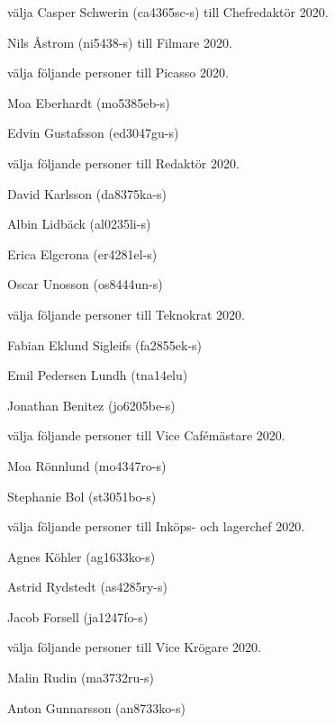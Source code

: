 \documentclass[10pt]{article}
\begin{document}
\begin{paragrafer}
\begin{paralist}
    \Mba välja Casper Schwerin (ca4365sc-s) till Chefredaktör 2020.

    \Mba Nils Åstrom (ni5438-s) till Filmare 2020.

    \Mba välja följande personer till Picasso 2020.
    \begin{tightdashlist}
        \item Moa Eberhardt (mo5385eb-s)
        \item Edvin Gustafsson (ed3047gu-s)
    \end{tightdashlist}

    \Mba välja följande personer till Redaktör 2020.
    \begin{tightdashlist}
        \item David Karlsson (da8375ka-s)
        \item Albin Lidbäck (al0235li-s)
        \item Erica Elgcrona (er4281el-s)
        \item Oscar Unosson (os8444un-s)
    \end{tightdashlist}

    \Mba välja följande personer till Teknokrat 2020.
    \begin{tightdashlist}
        \item Fabian Eklund Sigleifs (fa2855ek-s)
        \item Emil Pedersen Lundh (tna14elu)
        \item Jonathan Benitez (jo6205be-s)
    \end{tightdashlist}

    \Mba välja följande personer till Vice Cafémästare 2020.
    \begin{tightdashlist}
        \item Moa Rönnlund (mo4347ro-s)
        \item Stephanie Bol (st3051bo-s)
    \end{tightdashlist}

    \Mba välja följande personer till Inköps- och lagerchef 2020.
    \begin{tightdashlist}
        \item Agnes Köhler (ag1633ko-s)
        \item Astrid Rydstedt (as4285ry-s)
        \item Jacob Forsell (ja1247fo-s)
    \end{tightdashlist}


    \Mba välja följande personer till Vice Krögare 2020.
    \begin{tightdashlist}
        \item Malin Rudin (ma3732ru-s)
        \item Anton Gunnarsson (an8733ko-s)
    \end{tightdashlist}


\end{paralist}
\end{paragrafer}
\end{document}
